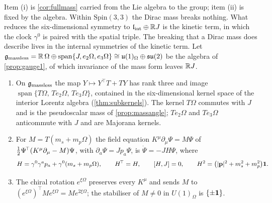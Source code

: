 Item (i) is \cref{cor:fullmass} carried from the Lie algebra to the group; item (ii) is fixed by the algebra. Within $\mathrm{Spin}(3,3)$
the Dirac mass breaks nothing. What reduces the six-dimensional symmetry to $\mathfrak l_{\rm int}\oplus\mathbb{R} J$ is the kinetic term, in which the clock
$\gamma^0$ is paired with the spatial triple. The breaking that a Dirac mass does describe lives in the internal symmetries of the
kinetic term. Let $\mathfrak g_{\rm massless}=\mathbb{R}\,\Omega\oplus\operatorname{span}\{J,e_2\Omega,e_3\Omega\}\cong\mathfrak{u}(1)_\Omega\oplus\mathfrak{su}(2)$ be the
algebra of \cref{prop:gauge1}, of which invariance of the mass form leaves $\mathbb{R} J$.

\begin{proposition}
\label{mb:massless}
\begin{enumerate}[label=(\roman*),leftmargin=2.2em]
\item On $\mathfrak g_{\rm massless}$ the map $Y\mapsto Y^{\!\top}T+TY$ has rank three and image $\operatorname{span}\{T\Omega,\,Te_2\Omega,\,Te_3\Omega\}$,
contained in the six-dimensional kernel space of the interior Lorentz algebra (\cref{thm:subkernels}). The kernel $T\Omega$ commutes
with $J$ and is the pseudoscalar mass of \cref{prop:massangle}; $Te_2\Omega$ and $Te_3\Omega$ anticommute with $J$ and are Majorana kernels.
\item For $M=T(m_s+m_p\Omega)$ the field equation $K^\mu\partial_\mu\Psi=M\Psi$ of $\tfrac12\Psi^{\!\top}(K^\mu\partial_\mu-M)\Psi$, with
$\partial_a\Psi=Jp_a\Psi$, is $\dot\Psi=-JH\Psi$, where
\begin{equation}
\label{mb:eq:Hmp}
H=\gamma^0\gamma^ap_a+\gamma^0(m_s+m_p\Omega),\qquad H^{\!\top}=H,\qquad [H,J]=0,\qquad H^2=\bigl(|\mathbf p|^2+m_s^2+m_p^2\bigr)\mathbf 1 .
\end{equation}
\item The chiral rotation $e^{\xi\Omega}$ preserves every $K^\mu$ and sends $M$ to $(e^{\xi\Omega})^{\!\top}Me^{\xi\Omega}=Me^{2\xi\Omega}$; the stabiliser
of $M\neq0$ in $U(1)_\Omega$ is $\{\pm\mathbf 1\}$.
\end{enumerate}
\end{proposition}

